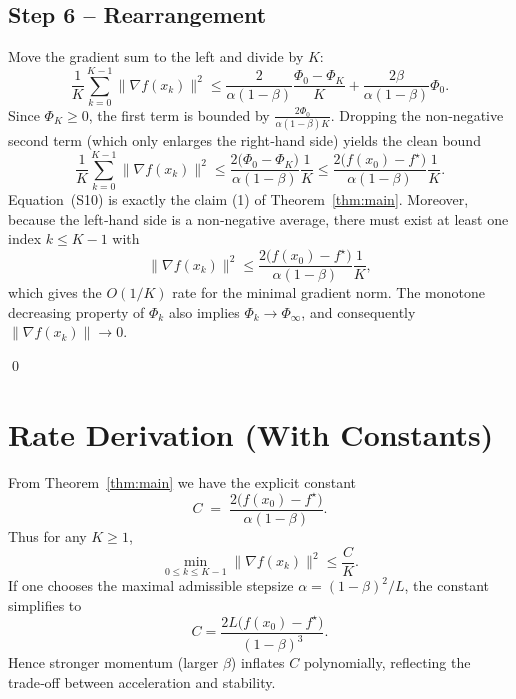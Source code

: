 \documentclass{article}
\newcommand{\grad}{\nabla}
\begin{document}
\subsection*{Step 6 – Rearrangement}
Move the gradient sum to the left and divide by $K$:
\[
\frac{1}{K}\sum_{k=0}^{K-1}\|\grad f(x_k)\|^2
\le
\frac{2}{\alpha(1-\beta)}\frac{\Phi_{0}-\Phi_{K}}{K}
+\frac{2\beta}{\alpha(1-\beta)}\Phi_0 .
\tag{S9}
\]
Since $\Phi_K\ge 0$, the first term is bounded by $\frac{2\Phi_0}{\alpha(1-\beta)K}$. Dropping the non‑negative second term (which only enlarges the right‑hand side) yields the clean bound
\[
\frac{1}{K}\sum_{k=0}^{K-1}\|\grad f(x_k)\|^2
\le
\frac{2\bigl(\Phi_0-\Phi_K\bigr)}{\alpha(1-\beta)}\frac{1}{K}
\le
\frac{2\bigl(f(x_0)-f^\star\bigr)}{\alpha(1-\beta)}\frac{1}{K}.
\tag{S10}
\]
Equation~(S10) is exactly the claim (1) of Theorem~\ref{thm:main}. Moreover, because the left‑hand side is a non‑negative average, there must exist at least one index $k\le K-1$ with
\[
\|\grad f(x_k)\|^2 \le \frac{2\bigl(f(x_0)-f^\star\bigr)}{\alpha(1-\beta)}\frac{1}{K},
\]
which gives the $O(1/K)$ rate for the minimal gradient norm. The monotone decreasing property of $\Phi_k$ also implies $\Phi_k\to\Phi_\infty$, and consequently $\|\grad f(x_k)\|\to0$.

\hfill\qed

\section*{Rate Derivation (With Constants)}
From Theorem~\ref{thm:main} we have the explicit constant
\[
C\;=\;\frac{2\bigl(f(x_0)-f^\star\bigr)}{\alpha(1-\beta)}.
\]
Thus for any $K\ge1$,
\[
\min_{0\le k\le K-1}\|\grad f(x_k)\|^2 \le \frac{C}{K}.
\]
If one chooses the maximal admissible stepsize $\alpha=(1-\beta)^2/L$, the constant simplifies to
\[
C = \frac{2L\bigl(f(x_0)-f^\star\bigr)}{(1-\beta)^3}.
\]
Hence stronger momentum (larger $\beta$) inflates $C$ polynomially, reflecting the trade‑off between acceleration and stability.

\end{document}
